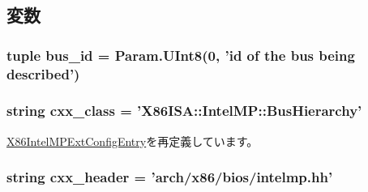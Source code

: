 \subsection{変数}
\hypertarget{classIntelMP_1_1X86IntelMPBusHierarchy_a6e34d01145c4deea78b58e36f0a7e81b}{
\subsubsection[{bus\_\-id}]{\setlength{\rightskip}{0pt plus 5cm}tuple {\bf bus\_\-id} = Param.UInt8(0, 'id of the bus being described')}}
\label{classIntelMP_1_1X86IntelMPBusHierarchy_a6e34d01145c4deea78b58e36f0a7e81b}
\hypertarget{classIntelMP_1_1X86IntelMPBusHierarchy_a58cd55cd4023648e138237cfc0822ae3}{
\subsubsection[{cxx\_\-class}]{\setlength{\rightskip}{0pt plus 5cm}string {\bf cxx\_\-class} = '{\bf X86ISA::IntelMP::BusHierarchy}'}}
\label{classIntelMP_1_1X86IntelMPBusHierarchy_a58cd55cd4023648e138237cfc0822ae3}


\hyperlink{classIntelMP_1_1X86IntelMPExtConfigEntry_a58cd55cd4023648e138237cfc0822ae3}{X86IntelMPExtConfigEntry}を再定義しています。\hypertarget{classIntelMP_1_1X86IntelMPBusHierarchy_a17da7064bc5c518791f0c891eff05fda}{
\subsubsection[{cxx\_\-header}]{\setlength{\rightskip}{0pt plus 5cm}string {\bf cxx\_\-header} = 'arch/x86/bios/intelmp.hh'}}
\label{classIntelMP_1_1X86IntelMPBusHierarchy_a17da7064bc5c518791f0c891eff05fda}


